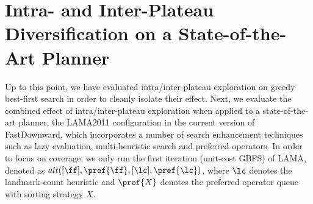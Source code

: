 \section{Intra- and Inter-Plateau Diversification on a State-of-the-Art Planner} %

Up to this point, we have evaluated intra/inter-plateau exploration on greedy best-first search in order to cleanly isolate their effect.
Next, we evaluate the combined effect of intra/inter-plateau exploration when applied to a state-of-the-art planner,
% 
the LAMA2011 configuration in the current version of FastDownward,
which incorporates a number of search enhancement techniques such as lazy evaluation, multi-heuristic search and preferred operators.
In order to focus on coverage, we only run the first iteration (unit-cost GBFS) of LAMA, 
denoted as $alt([\ff],\pref{\ff},[\lc],\pref{\lc})$, where
$\lc$ denotes the landmark-count heuristic
and $\pref{X}$ denotes the preferred operator queue with sorting strategy $X$.




% 

